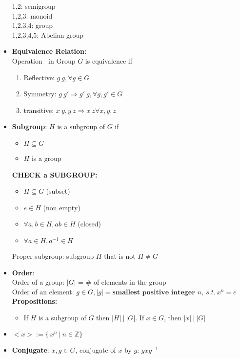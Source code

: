 \documentclass[12pt]{article}
\begin{document}
\begin{itemize}
        1,2: semigroup\\
        1,2,3: monoid\\
        1,2,3,4: group\\
        1,2,3,4,5: Abelian group
        \item \textbf{Equivalence Relation:}\\
        Operation $~$ in Group $G$ is equivalence if 
        \begin{enumerate}
            \item Reflective: $g ~ g, \forall g \in G$
            \item Symmetry: $g ~ g' \Rightarrow g' ~ g, \forall g,g' \in G$
            \item transitive: $x~y, y~z \Rightarrow x ~ z \forall x,y,z$
        \end{enumerate}
        \item \textbf{Subgroup}: $H$ is a subgroup of $G$ if
        \begin{itemize}
            \item $H \subseteq G$
            \item $H$ is a group
        \end{itemize}
        \textbf{CHECK a SUBGROUP:}
        \begin{itemize}
            \item $H \subseteq G$ (subset)
            \item $e \in H$ (non empty)
            \item $\forall a,b \in H, ab \in H$ (closed)
            \item $\forall a \in H, a^{-1} \in H$
        \end{itemize}
        Proper subgroup: subgroup $H$ that is not $H \ne G$
        \item \textbf{Order}:\\
        Order of a group: $|G|$ = \# of elements in the group\\
        Order of an element: $g\in G, |g| = \textbf{smallest positive integer }n, \ s.t. \ x^n = e$\\
        \textbf{Propositions:}
        \begin{itemize}
            \item If $H$ is a subgroup of $G$ then $|H| \ | \ |G|$. If $x \in G$, then $|x| \ | \ |G|$
        \end{itemize}
        \item $<x> := \{\ x^n \ | \ n \in \mathbb{Z}\}$
        \item \textbf{Conjugate}: $x,g\in G$, conjugate of $x$ by $g$: $gxg^{-1}$\\

\end{itemize}
\end{document}
